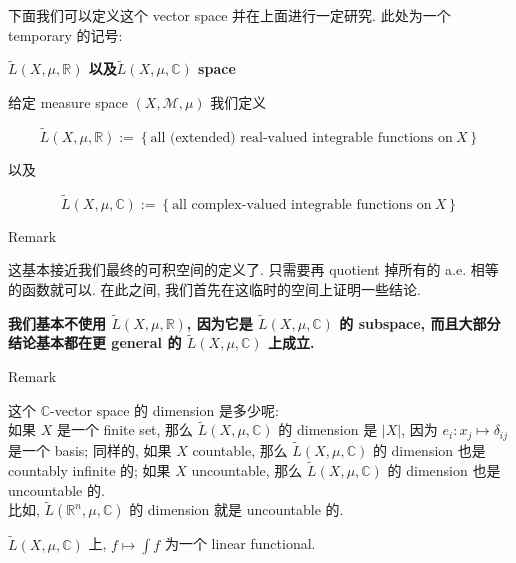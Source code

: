 \documentclass{qlnotes-export}
\begin{document}
下面我们可以定义这个 vector space 并在上面进行一定研究. 此处为一个 temporary 的记号:

\begin{definition}{\protect{}\label{kn-tilde-l-x-mu-mathbb-r-tilde-l-x-mu-mathbb-c-space}{\textbf{\(\widetilde{L}(X,\mu,{\mathbb{R}})\)
以及\(\widetilde{L}(X,\mu,{\mathbb{C}})\) space}}}

给定 measure space \((X,\mathcal{M},\mu)\) 我们定义

\[\widetilde{L}(X,\mu,{\mathbb{R}}) := \left\{ {\text{all (extended) real-valued integrable functions on}\ X} \right\}\]

以及

\[\widetilde{L}(X,\mu,{\mathbb{C}}) := \left\{ {\text{all complex-valued integrable functions on}\ X} \right\}\]

\end{definition}

\begin{qlremark}{Remark}

这基本接近我们最终的可积空间的定义了. 只需要再 quotient 掉所有的 a.e. 相等的函数就可以. 在此之间, 我们首先在这临时的空间上证明一些结论.

\textbf{我们基本不使用 \(\widetilde{L}(X,\mu,{\mathbb{R}})\), 因为它是 \(\widetilde{L}(X,\mu,{\mathbb{C}})\) 的 subspace, 而且大部分结论基本都在更 general 的 \(\widetilde{L}(X,\mu,{\mathbb{C}})\) 上成立.}

\end{qlremark}

\begin{qlremark}{Remark}

这个 \(\mathbb{C}\)-vector space 的 dimension 是多少呢:\\
如果 \(X\) 是一个 finite set, 那么 \(\widetilde{L}(X,\mu,{\mathbb{C}})\) 的 dimension 是 \(|X|\), 因为 \(e_{i}:x_{j}\mapsto\delta_{ij}\) 是一个 basis; 同样的, 如果 \(X\) countable, 那么 \(\widetilde{L}(X,\mu,{\mathbb{C}})\) 的 dimension 也是 countably infinite 的; 如果 \(X\) uncountable, 那么 \(\widetilde{L}(X,\mu,{\mathbb{C}})\) 的 dimension 也是 uncountable 的.\\
比如, \(\widetilde{L}({\mathbb{R}}^{n},\mu,{\mathbb{C}})\) 的 dimension 就是 uncountable 的.

\end{qlremark}

\begin{proposition}

\(\widetilde{L}(X,\mu,{\mathbb{C}})\) 上, \(f\mapsto\int f\) 为一个 linear functional.

\end{proposition}
\end{document}
